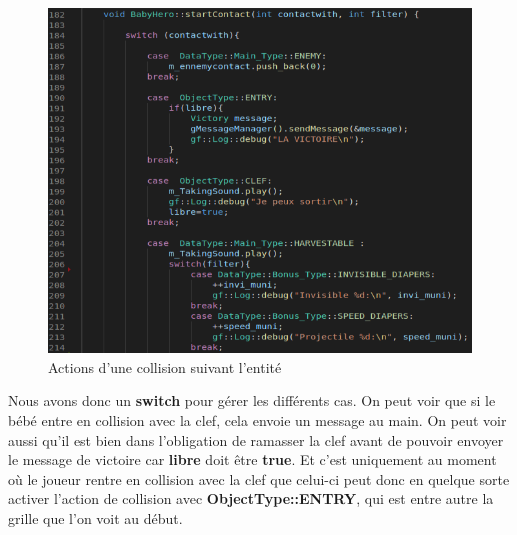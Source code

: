 \documentclass{article}
\begin{document}
\begin{figure}[ht]
    \begin{center}
    \includegraphics[scale=0.55]{images/baby_collisions.png}
    \caption{Actions d'une collision suivant l'entité}
    \label{baby_collisions} 
    \end{center}
\end{figure}

Nous avons donc un \textbf{switch} pour gérer les différents cas. On peut voir que si le bébé entre en collision avec la clef, cela envoie un message au main. On peut voir aussi qu'il est bien dans l'obligation de ramasser la clef avant de pouvoir envoyer le message de victoire car \textbf{libre} doit être \textbf{true}. Et c'est uniquement au moment où le joueur rentre en collision avec la clef que celui-ci peut donc en quelque sorte \og activer \fg l'action de collision avec \textbf{ObjectType::ENTRY}, qui est entre autre la grille que l'on voit au début.
\end{document}
